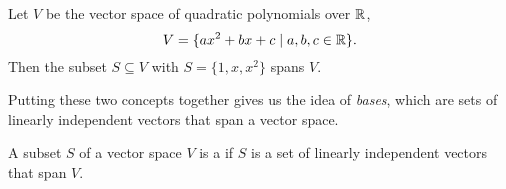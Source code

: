 \documentclass[a4paper]{scrartcl}
\begin{document}
\begin{example}
    Let $V$ be the vector space of quadratic polynomials over $\mathbb{R}$, 
    $$V = \{ax^2 + bx + c \mid a, b, c \in \mathbb{R}\}.$$ 
    Then the subset $S \subseteq V$ with $S = \{1, x, x^2\}$ spans $V$.
\end{example}






Putting these two concepts together gives us the idea of \emph{bases}, which are sets of linearly independent vectors that span a vector space.

\begin{definition}[Basis]
    A subset $S$ of a vector space $V$ is a  if $S$ is a set of linearly independent vectors that span $V$.
\end{definition}
\end{document}
